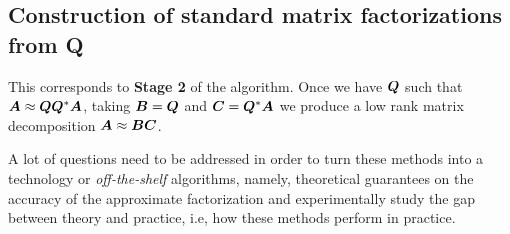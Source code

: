 \begin{figure}[ht]
\begin{center}
\end{center}
\end{figure}

\subsection{Construction of standard matrix factorizations from Q}

This corresponds to \textbf{Stage 2} of the algorithm. Once we have $\bm{Q}$
such that $\bm{A}\approx\bm{Q}\bm{Q}^*\bm{A}$, taking 
$\bm{B}=\bm{Q}$ and $\bm{C}=\bm{Q}^*\bm{A}$ we produce a low rank
matrix decomposition $\bm{A}\approx\bm{B}\bm{C}$.



A lot of questions need to be addressed in order to turn these methods into
a technology or \textit{off-the-shelf} algorithms, namely, 
theoretical guarantees on the accuracy of the approximate factorization and
experimentally study the gap between theory and practice, i.e, how these
methods perform in practice.
